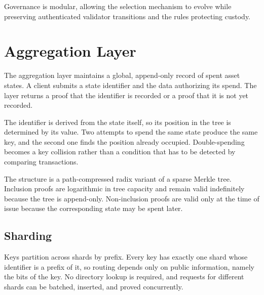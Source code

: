 Governance is modular, allowing the selection mechanism to evolve while preserving authenticated validator transitions and the rules protecting custody.

\section{Aggregation Layer}

The aggregation layer maintains a global, append-only record of spent asset states. A client submits a state identifier and the data authorizing its spend. The layer returns a proof that the identifier is recorded or a proof that it is not yet recorded.

The identifier is derived from the state itself, so its position in the tree is determined by its value. Two attempts to spend the same state produce the same key, and the second one finds the position already occupied. Double-spending becomes a key collision rather than a condition that has to be detected by comparing transactions.

The structure is a path-compressed radix variant of a sparse Merkle tree. Inclusion proofs are logarithmic in tree capacity and remain valid indefinitely because the tree is append-only. Non-inclusion proofs are valid only at the time of issue because the corresponding state may be spent later.

\subsection{Sharding}

Keys partition across shards by prefix. Every key has exactly one shard whose identifier is a prefix of it, so routing depends only on public information, namely the bits of the key. No directory lookup is required, and requests for different shards can be batched, inserted, and proved concurrently.

